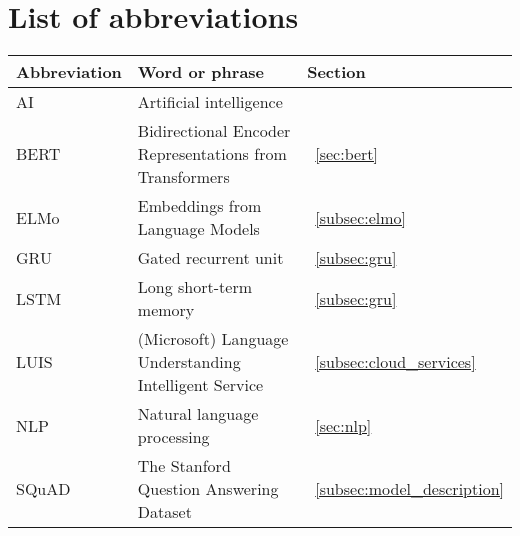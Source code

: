 \chapter*{List of abbreviations}
\label{ch:abbrevations}

\begin{tabular}{l l l}
    \textbf{Abbreviation} & \textbf{Word or phrase} & \textbf{Section} \\
    \hline
    AI & Artificial intelligence &\\
    BERT & Bidirectional Encoder Representations from Transformers &~\ref{sec:bert}\\
    ELMo & Embeddings from Language Models &~\ref{subsec:elmo}\\
    GRU & Gated recurrent unit &~\ref{subsec:gru}\\
    LSTM & Long short-term memory &~\ref{subsec:gru}\\
    LUIS & (Microsoft) Language Understanding Intelligent Service &~\ref{subsec:cloud_services}\\
    NLP & Natural language processing &~\ref{sec:nlp}\\
    SQuAD & The Stanford Question Answering Dataset &~\ref{subsec:model_description}\\
\end{tabular}